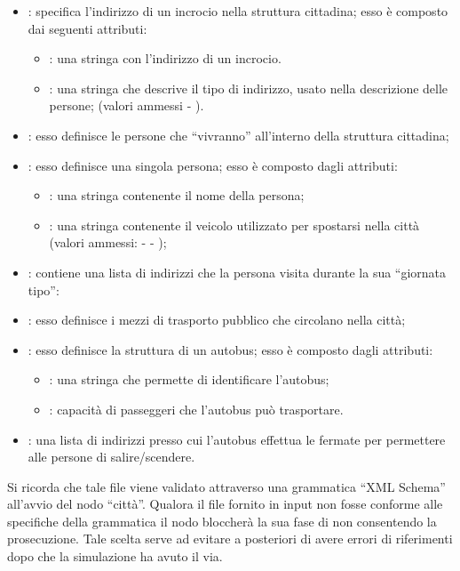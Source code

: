\begin{itemize}
\item{: specifica l'indirizzo di un incrocio nella struttura cittadina; esso è composto dai seguenti attributi:}
\begin{itemize}
\item{: una stringa con l'indirizzo di un incrocio.}
\item{: una stringa che descrive il tipo di indirizzo, usato nella descrizione delle persone; (valori ammessi  - ).}
\end{itemize}
\item{: esso definisce le persone che ``vivranno'' all'interno della struttura cittadina;}
\item{: esso definisce una singola persona; esso è composto dagli attributi:}
\begin{itemize}
\item{: una stringa contenente il nome della persona;}
\item{: una stringa contenente il veicolo utilizzato per spostarsi nella città (valori ammessi:  -  - );}
\end{itemize}
\item{: contiene una lista di indirizzi che la persona visita durante la sua ``giornata tipo'':}
\item{: esso definisce i mezzi di trasporto pubblico che circolano nella città;}
\item{: esso definisce la struttura di un autobus; esso è composto dagli attributi:}
\begin{itemize}
\item{: una stringa che permette di identificare l'autobus;}
\item{: capacità di passeggeri che l'autobus può trasportare.}
\end{itemize}
\item{: una lista di indirizzi presso cui l'autobus effettua le fermate per permettere alle persone di salire/scendere.}
\end{itemize}

Si ricorda che tale file viene validato attraverso una grammatica ``XML Schema'' all'avvio del nodo ``città''. Qualora il file fornito in input non fosse conforme alle specifiche della grammatica il nodo bloccherà la sua fase di  non consentendo la prosecuzione. Tale scelta serve ad evitare a posteriori di avere errori di riferimenti dopo che la simulazione ha avuto il via.

